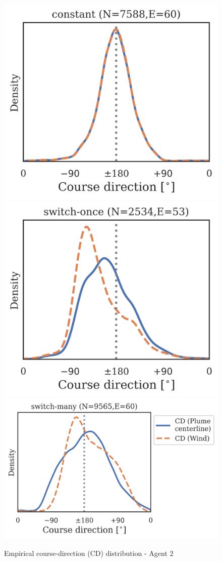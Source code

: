 \documentclass[5p,twocolumn,authoryear]{elsarticle}
\begin{document}
\begin{figure}[h!]
\centering
\includegraphics[width=0.28\linewidth]{regime_dists_3199993_constantx5b5_TRACK_CD.png}
\includegraphics[width=0.28\linewidth]{regime_dists_3199993_switch45x5b5_TRACK_CD.png}
\includegraphics[width=0.405\linewidth]{regime_dists_3199993_noisy3x5b5_TRACK_CD.png}
\caption{Empirical course-direction (CD) distribution - Agent 2} 
\end{figure}
\end{document}
